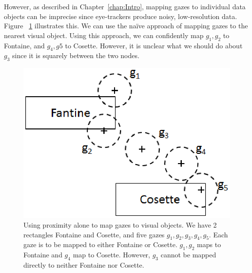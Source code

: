 However, as described in Chapter~\ref{chap:Intro}, mapping gazes to individual data objects can be imprecise since eye-trackers produce noisy, low-resolution data. Figure ~\ref{fig:MiserablesGaze} illustrates this. We can use the na\"{i}ve approach of mapping gazes to the nearest visual object. Using this approach, we can confidently map $g_1, g_2$ to Fontaine, and $g_4, g5$ to Cosette. However, it is unclear what we should do about $g_3$ since it is squarely between the two nodes. 

\begin{figure}[htb]
  \centering
  \includegraphics[width=0.75\linewidth]{images/MiserablesGaze.eps}
  \caption{Using proximity alone to map gazes to visual objects. We have 2 rectangles Fontaine and Cosette, and five gazes $g_1, g_2, g_3, g_4, g_5$. Each gaze is to be mapped to either Fontaine or Cosette. $g_1, g_2$ maps to Fontaine and $g_4$ map to Cosette. However, $g_3$ cannot be mapped directly to neither Fontaine nor Cosette. }
    \label{fig:MiserablesGaze}
\end{figure}